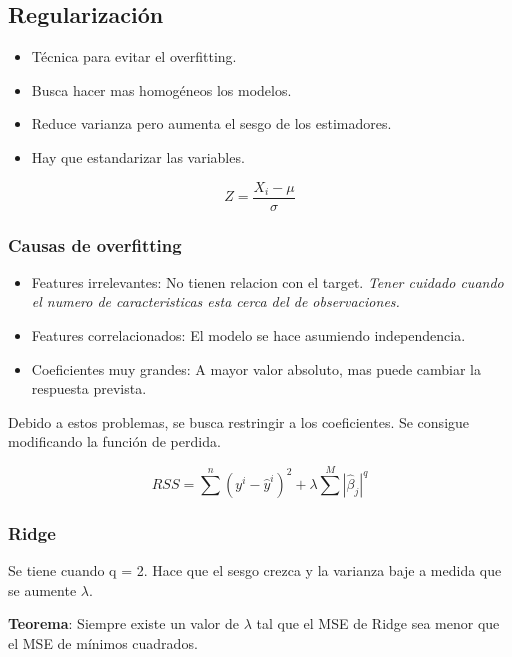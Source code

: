 \documentclass[titlepage,a4paper]{article}
\begin{document}
\subsection{Regularización} \label{regularizaciones}
\begin{itemize}
    \item Técnica para evitar el overfitting.
    \item Busca hacer mas homogéneos los modelos.
    \item Reduce varianza pero aumenta el sesgo de los estimadores.
    \item Hay que estandarizar las variables.
\end{itemize}

\begin{equation}
    Z = \frac{X_i - \mu}{\sigma}
\end{equation}

\subsubsection*{Causas de overfitting}
\begin{itemize}
    \item Features irrelevantes: No tienen relacion con el target. \textit{Tener cuidado cuando el numero de caracteristicas esta cerca del de observaciones.}
    \item Features correlacionados: El modelo se hace asumiendo independencia.
    \item Coeficientes muy grandes: A mayor valor absoluto, mas puede cambiar la respuesta prevista.
\end{itemize}

Debido a estos problemas, se busca restringir a los coeficientes. Se consigue modificando la función de perdida.

\begin{equation}
    RSS = \sum^{n} (y^{i}-\hat{y}^{i})^{2} + \lambda \sum^{M} |\hat{\beta}_j|^{q}
\end{equation}

\subsubsection{Ridge}
Se tiene cuando q = 2. Hace que el sesgo crezca y la varianza baje a medida que se aumente $\lambda$.

\textbf{Teorema}: Siempre existe un valor de $\lambda$ tal que el MSE de Ridge sea menor que el MSE de mínimos cuadrados.
\end{document}
